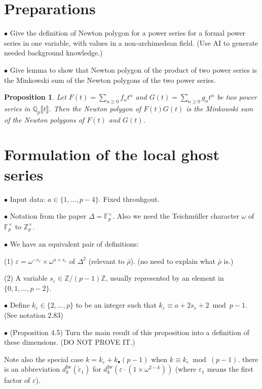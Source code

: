 \documentclass[12pt]{amsart}
\newtheorem{proposition}[subsection]{Proposition}
\theoremstyle{definition}
\numberwithin{equation}{subsection}
\def\FF{\mathbb{F}}
\def\QQ{\mathbb{Q}}
\def\ZZ{\mathbb{Z}}
\newcommand{\Iw}{\mathrm{Iw}}
\begin{document}
\section{Preparations}

$\bullet$ Give the definition of Newton polygon for a power series for a formal power series in one variable, with values in a non-archimedean field. (Use AI to generate needed background knowledge.)

$\bullet$ Give lemma to show that Newton polygon of the product of two power series is the Minkowski sum of the Newton polygons of the two power series.

\begin{proposition}
    Let $F(t) = \sum_{n \geq 0} f_n t^n$ and $G(t) = \sum_{n \geq 0} g_n t^n$ be two power series in $\QQ_p\llbracket t\rrbracket$. Then the Newton polygon of $F(t)G(t)$ is the Minkowski sum of the Newton polygons of $F(t)$ and $G(t)$.
\end{proposition}

\section{Formulation of the local ghost series}

$\bullet$ Input data: $a \in \{1, \dots, p-4\}$. Fixed throuhgout.

$\bullet$ Notation from the paper $\Delta = \FF_p^\times$. Also we need the Teichmüller character $\omega$ of $\FF_p^\times$ to $\ZZ_p^\times$.

$\bullet$ We have an equivalent pair of definitions:

(1) $\varepsilon = \omega^{-s_\varepsilon} \times \omega^{a+s_\varepsilon}$ of $\Delta^2$ (relevant to $\bar \rho$). (no need to explain what $\bar \rho$ is.)

(2) A variable $s_\varepsilon \in \ZZ/(p-1)\ZZ$, usually represented by an element in $\{0, 1, \dots, p-2\}$.


$\bullet$ Define $k_\varepsilon \in \{2, \dots, p\}$ to be an integer such that $k_\varepsilon \equiv a+2s_\varepsilon+2 \bmod{p-1}$. (See notation 2.83)

$\bullet$ (Proposition 4.5) Turn the main result of this proposition into a definition of these dimensions.  (DO NOT PROVE IT.)

Note also the special case $k = k_\varepsilon + k_\bullet (p-1)$ when $k \equiv k_\varepsilon \bmod{(p-1)}$. there is an abbreviation $d_k^\Iw(\tilde \varepsilon_1)$ for $d_k^\Iw(\varepsilon\cdot (1\times \omega^{2-k}))$ (where $\varepsilon_1$ means the first factor of $\varepsilon$).
\end{document}
